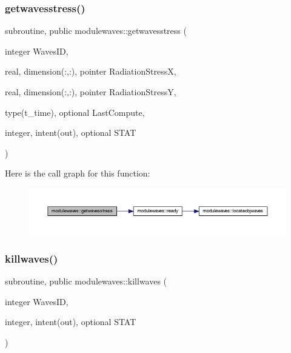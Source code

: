 \subsubsection{\texorpdfstring{getwavesstress()}{getwavesstress()}}
{\footnotesize\ttfamily subroutine, public modulewaves\+::getwavesstress (\begin{DoxyParamCaption}\item[{integer}]{Waves\+ID,  }\item[{real, dimension(\+:,\+:), pointer}]{Radiation\+StressX,  }\item[{real, dimension(\+:,\+:), pointer}]{Radiation\+StressY,  }\item[{type(t\+\_\+time), optional}]{Last\+Compute,  }\item[{integer, intent(out), optional}]{S\+T\+AT }\end{DoxyParamCaption})}

Here is the call graph for this function\+:\nopagebreak
\begin{figure}[H]
\begin{center}
\leavevmode
\includegraphics[width=350pt]{namespacemodulewaves_a0fa381ad7f743e71a910cb5aafaea3c4_cgraph}
\end{center}
\end{figure}
\mbox{\label{namespacemodulewaves_ac7cfc1f43634cac51c36130e5d101c5d}} 
\subsubsection{\texorpdfstring{killwaves()}{killwaves()}}
{\footnotesize\ttfamily subroutine, public modulewaves\+::killwaves (\begin{DoxyParamCaption}\item[{integer}]{Waves\+ID,  }\item[{integer, intent(out), optional}]{S\+T\+AT }\end{DoxyParamCaption})}

